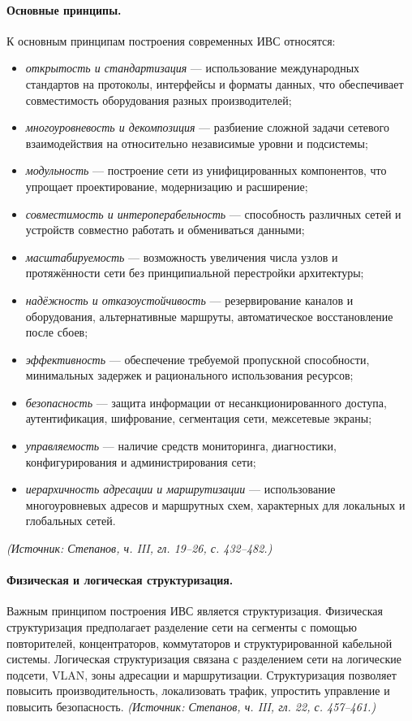 \documentclass[a4paper,12pt]{article}
\begin{document}
\paragraph{Основные принципы.}
К основным принципам построения современных ИВС относятся:
\begin{itemize}
\item \emph{открытость и стандартизация} — использование международных стандартов на протоколы, интерфейсы и форматы данных, что обеспечивает совместимость оборудования разных производителей;
\item \emph{многоуровневость и декомпозиция} — разбиение сложной задачи сетевого взаимодействия на относительно независимые уровни и подсистемы;
\item \emph{модульность} — построение сети из унифицированных компонентов, что упрощает проектирование, модернизацию и расширение;
\item \emph{совместимость и интероперабельность} — способность различных сетей и устройств совместно работать и обмениваться данными;
\item \emph{масштабируемость} — возможность увеличения числа узлов и протяжённости сети без принципиальной перестройки архитектуры;
\item \emph{надёжность и отказоустойчивость} — резервирование каналов и оборудования, альтернативные маршруты, автоматическое восстановление после сбоев;
\item \emph{эффективность} — обеспечение требуемой пропускной способности, минимальных задержек и рационального использования ресурсов;
\item \emph{безопасность} — защита информации от несанкционированного доступа, аутентификация, шифрование, сегментация сети, межсетевые экраны;
\item \emph{управляемость} — наличие средств мониторинга, диагностики, конфигурирования и администрирования сети;
\item \emph{иерархичность адресации и маршрутизации} — использование многоуровневых адресов и маршрутных схем, характерных для локальных и глобальных сетей.
\end{itemize}
\textit{(Источник: Степанов, ч. III, гл. 19–26, с. 432–482.)}

\paragraph{Физическая и логическая структуризация.}
Важным принципом построения ИВС является структуризация. Физическая структуризация предполагает разделение сети на сегменты с помощью повторителей, концентраторов, коммутаторов и структурированной кабельной системы. Логическая структуризация связана с разделением сети на логические подсети, VLAN, зоны адресации и маршрутизации. Структуризация позволяет повысить производительность, локализовать трафик, упростить управление и повысить безопасность.
\textit{(Источник: Степанов, ч. III, гл. 22, с. 457–461.)}
\end{document}

